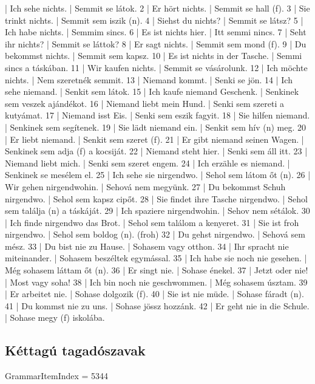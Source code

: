 \documentclass{article}
\newenvironment{exmp}{\verbatim}{\endverbatim}
\begin{document}
\begin{exmp}
1 | Ich sehe nichts. | Semmit se látok.
2 | Er hört nichts. | Semmit se hall (f).
3 | Sie trinkt nichts. | Semmit sem iszik (n).
4 | Siehst du nichts? | Semmit se látsz?
5 | Ich habe nichts. | Semmim sincs.
6 | Es ist nichts hier. | Itt semmi nincs.
7 | Seht ihr nichts? | Semmit se láttok?
8 | Er sagt nichts. | Semmit sem mond (f).
9 | Du bekommst nichts. | Semmit sem kapsz.
10 | Es ist nichts in der Tasche. | Semmi sincs a táskában.
11 | Wir kaufen nichts. | Semmit se vásárolunk.
12 | Ich möchte nichts. | Nem szeretnék semmit.
13 | Niemand kommt. | Senki se jön.
14 | Ich sehe niemand. | Senkit sem látok.
15 | Ich kaufe niemand Geschenk. | Senkinek sem veszek ajándékot.
16 | Niemand liebt mein Hund. | Senki sem szereti a kutyámat.
17 | Niemand isst Eis. | Senki sem eszik fagyit.
18 | Sie hilfen niemand. | Senkinek sem segítenek.
19 | Sie lädt niemand ein. | Senkit sem hív (n) meg.
20 | Er liebt niemand. | Senkit sem szeret (f).
21 | Er gibt niemand seinen Wagen. | Senkinek sem adja (f) a kocsiját.
22 | Niemand steht hier. | Senki sem áll itt.
23 | Niemand liebt mich. | Senki sem szeret engem.
24 | Ich erzähle es niemand. | Senkinek se mesélem el.
25 | Ich sehe sie nirgendwo. | Sehol sem látom őt (n).
26 | Wir gehen nirgendwohin. | Sehová nem megyünk.
27 | Du bekommst Schuh nirgendwo. | Sehol sem kapsz cipőt.
28 | Sie findet ihre Tasche nirgendwo. | Sehol sem találja (n) a táskáját.
29 | Ich spaziere nirgendwohin. | Sehov nem sétálok.
30 | Ich finde nirgendwo das Brot. | Sehol sem találom a kenyeret.
31 | Sie ist froh nirgendwo. | Sehol sem boldog (n). (froh)
32 | Du gehst nirgendwo. | Sehová sem mész.
33 | Du bist nie zu Hause. | Sohasem vagy otthon.
34 | Ihr spracht nie miteinander. | Sohasem beszéltek egymással.
35 | Ich habe sie noch nie gesehen. | Még sohasem láttam őt (n).
36 | Er singt nie. | Sohase énekel.
37 | Jetzt oder nie! | Most vagy soha!
38 | Ich bin noch nie geschwommen. | Még sohasem úsztam.
39 | Er arbeitet nie. | Sohase dolgozik (f).
40 | Sie ist nie müde. | Sohase fáradt (n).
41 | Du kommst nie zu uns. | Sohase jössz hozzánk.
42 | Er geht nie in die Schule. | Sohase megy (f) iskolába.
\end{exmp}

\subsection{Kéttagú tagadószavak}

GrammarItemIndex = 5344
\end{document}
